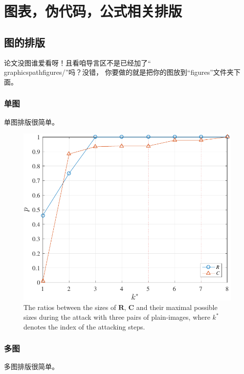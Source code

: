 \chapter{图表，伪代码，公式相关排版}\label{elements}

\section{图的排版}
论文没图谁爱看呀！且看咱导言区不是已经加了``\\graphicspath{{figures/}}''吗？没错，
你要做的就是把你的图放到``figures''文件夹下面。

\subsection{单图}
单图排版很简单。

\begin{figure}[!htb]
\centering
\begin{minipage}[t]{2\imagewidth}
\centering
\includegraphics[width=2\imagewidth]{Correct_Ratio}
\end{minipage}
\caption{The ratios between the sizes of $\bm{R}$, $\bm{C}$ and their maximal possible sizes during the attack with three pairs of plain-images,
where $k^*$ denotes the index of the attacking steps.}
\label{fig:ratio}
\end{figure}

\subsection{多图}
多图排版很简单。

